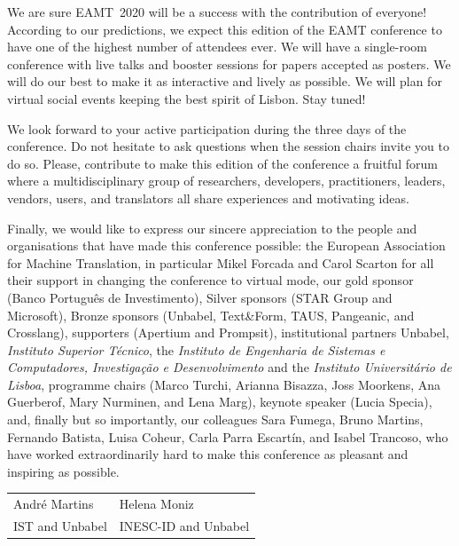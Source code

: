 \documentclass[a4paper,11pt,twoside]{book}
\begin{document}
\begin{onehalfspacing}
We are sure EAMT~2020 will be a success with the contribution of everyone! According to our predictions, we expect this edition of the EAMT conference to have one of the highest number of attendees ever. We will have a single-room conference with live talks and booster sessions for papers accepted as posters. We will do our best to make it as interactive and lively as possible. We will plan for virtual social events keeping the best spirit of Lisbon. Stay tuned!

We look forward to your active participation during the three days of the conference. Do not hesitate to ask questions when the session chairs invite you to do so. Please, contribute to make this edition of the conference a fruitful forum where a multidisciplinary group of researchers, developers, practitioners, leaders, vendors, users, and translators all share experiences and motivating ideas.

Finally, we would like to express our sincere appreciation to the people and organisations that have made this conference possible: the European Association for Machine Translation, in particular Mikel Forcada and Carol Scarton for all their support in changing the conference to virtual mode, our gold sponsor (Banco Português de Investimento), Silver sponsors (STAR Group and Microsoft), Bronze sponsors (Unbabel, Text\&Form, TAUS, Pangeanic, and Crosslang), supporters (Apertium and Prompsit), institutional partners Unbabel, \emph{Instituto Superior Técnico}, the \emph{Instituto de Engenharia de Sistemas e Computadores, Investigação e Desenvolvimento} and the \emph{Instituto Universitário de Lisboa}, programme chairs (Marco Turchi, Arianna Bisazza, Joss Moorkens, Ana Guerberof, Mary Nurminen, and Lena Marg), keynote speaker (Lucia Specia), and, finally but so importantly, our colleagues Sara Fumega, Bruno Martins, Fernando Batista, Luisa Coheur, Carla Parra Escartín, and Isabel Trancoso, who have worked extraordinarily hard to make this conference as pleasant and inspiring as possible. 




\vspace{1cm}
\begin{center}
\setlength{\tabcolsep}{20pt}
\begin{tabular}{ll}
André Martins		&  Helena Moniz\\
IST and Unbabel	& INESC-ID and Unbabel\\
\end{tabular}
\end{center}



\end{onehalfspacing}
\end{document}
